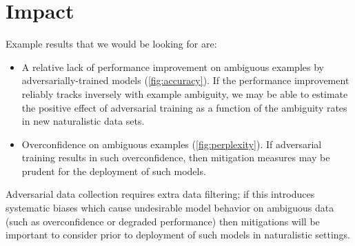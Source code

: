 \documentclass[10pt,a4paper]{article}
\begin{document}
\section*{Impact}
Example results that we would be looking for are:
\begin{itemize}
    \item A relative lack of performance improvement on ambiguous examples by adversarially-trained models (\autoref{fig:accuracy}). If the performance improvement reliably tracks inversely with example ambiguity, we may be able to estimate the positive effect of adversarial training as a function of the ambiguity rates in new naturalistic data sets. 
    \item Overconfidence on ambiguous examples (\autoref{fig:perplexity}). If adversarial training results in such overconfidence, then mitigation measures may be prudent for the deployment of such models.
\end{itemize}
Adversarial data collection requires extra data filtering; if this introduces systematic biases which cause undesirable model behavior on ambiguous data (such as overconfidence or degraded performance) then mitigations will be important to consider prior to deployment of such models in naturalistic settings.



\end{document}
